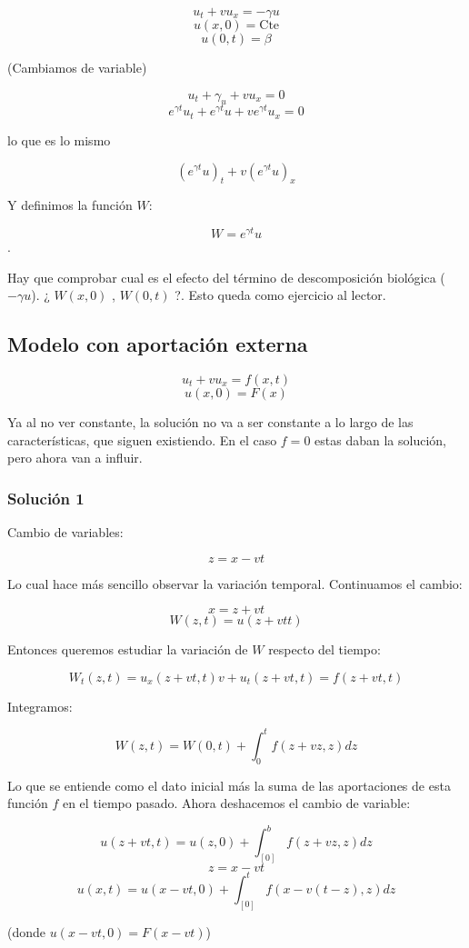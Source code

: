 \documentclass[palatino]{apuntes}
\begin{document}
$$u_t + vu_x = -\gamma u$$
$$u(x,0) = \text{Cte}$$
$$u(0,t) = \beta$$

(Cambiamos de variable)

$$u_t + \gamma_u + vu_x = 0$$
$$e^{\gamma t} u_t + e^{\gamma t} u + v e^{ \gamma t} u_x = 0 $$

lo que es lo mismo

$$(e^{\gamma t}u)_t + v (e^{\gamma t} u)_x$$

Y definimos la función $W$:

$$W = e^{\gamma t}u$$.


Hay que comprobar cual es el efecto del término de descomposición biológica ($-\gamma u$). ¿ $W(x,0)$ , $ W(0,t)$ ?. Esto queda como ejercicio al lector.


\subsection{Modelo con aportación externa}

$$u_t + vu_x = f(x,t)$$
$$u(x,0) = F(x)$$

Ya al no ver constante, la solución no va a ser constante a lo largo de las características, que siguen existiendo. En el caso $f = 0$ estas daban la solución, pero ahora van a influir.

\subsubsection{Solución 1}

Cambio de variables:

$$z = x-vt$$

Lo cual hace más sencillo observar la variación temporal. Continuamos el cambio:

$$x = z + vt$$
$$W(z,t) = u(z+vtt)$$

Entonces queremos estudiar la variación de $W$ respecto del tiempo:

$$W_t(z,t) = u_x(z + vt, t)v + u_t(z+vt, t) = f(z + vt, t)$$

Integramos:

$$W(z,t) = W(0,t) + \int^{t}_{0} f(z+vz, z) dz $$

Lo que se entiende como el dato inicial más la suma de las aportaciones de esta función $f$ en el tiempo pasado. Ahora deshacemos el cambio de variable:

$$u(z + vt, t) = u(z,0) + \int^{b}_[0] f(z+vz, z) dz$$
$$z = x-vt$$
$$u(x,t) = u(x-vt,0)+ \int^{t}_[0] f(x-v(t-z),z) dz$$

(donde $u(x-vt,0) = F(x-vt)$)
\end{document}
